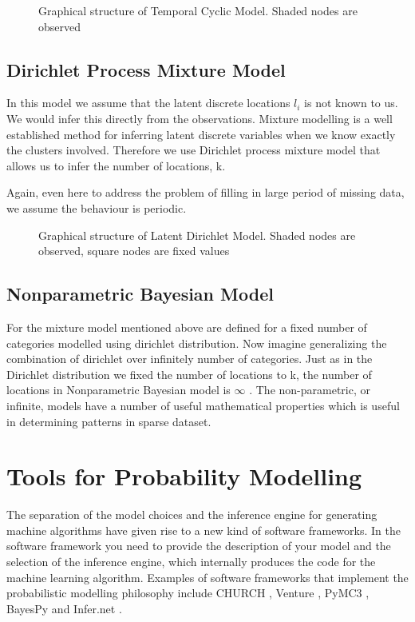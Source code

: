 \begin{figure}[htb] 
\centering 
\def\svgwidth{200pt} 
 
\caption{Graphical structure of Temporal Cyclic Model. Shaded nodes are observed} 
\end{figure} 

\FloatBarrier
\subsection*{Dirichlet Process Mixture Model}
\label{sec:dp model}
In this model we assume that the latent discrete locations $l_i$ is not known to us. We would infer this directly from the observations.
Mixture modelling is a well established method for inferring latent discrete variables when we know exactly the clusters involved.
Therefore we use Dirichlet process mixture model that allows us to infer the number of locations, k.

Again, even here to address the problem of filling in large period of missing data, we assume the behaviour is periodic.
\begin{figure}[htb] 
\centering 
\def\svgwidth{450pt} 
 
\caption{Graphical structure of Latent Dirichlet Model. Shaded nodes are observed, square nodes are fixed values} 
\end{figure} 

\FloatBarrier
\subsection*{Nonparametric Bayesian Model}
For the mixture model mentioned above are defined for a fixed number of categories modelled using dirichlet distribution. Now imagine generalizing the combination of dirichlet over infinitely number of categories. Just as in the Dirichlet distribution we fixed the number of locations to k, the number of locations in Nonparametric Bayesian model is $ \infty $ . The non-parametric, or infinite, models have a number of useful mathematical properties which is useful in determining patterns in sparse dataset.



\section{Tools for Probability Modelling}
\label{sec:tools}

The separation of the model choices and the inference engine for generating machine algorithms have given rise to a new kind of software frameworks.
In the software framework you need to provide the description of your model and the selection of the inference engine, which internally produces the code for the machine learning algorithm.
Examples of software frameworks that implement the probabilistic modelling philosophy  include CHURCH \cite{goodman_church_2012}, Venture \cite{mansinghka_venture_2014}, PyMC3 \cite{salvatier_probabilistic_2015}, BayesPy \cite{luttinen_bayespy_2014} and Infer.net \cite{minka_2010}.


